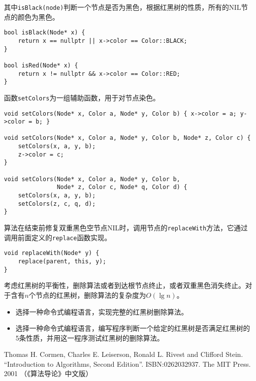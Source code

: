 \documentclass[UTF8]{article}
\begin{document}
其中\texttt{isBlack(node)}判断一个节点是否为黑色，根据红黑树的性质，所有的NIL节点的颜色为黑色。

\begin{lstlisting}
bool isBlack(Node* x) {
    return x == nullptr || x->color == Color::BLACK;
}

bool isRed(Node* x) {
    return x != nullptr && x->color == Color::RED;
}
\end{lstlisting}

函数\texttt{setColors}为一组辅助函数，用于对节点染色。

\begin{lstlisting}
void setColors(Node* x, Color a, Node* y, Color b) { x->color = a; y->color = b; }

void setColors(Node* x, Color a, Node* y, Color b, Node* z, Color c) {
    setColors(x, a, y, b);
    z->color = c;
}

void setColors(Node* x, Color a, Node* y, Color b,
               Node* z, Color c, Node* q, Color d) {
    setColors(x, a, y, b);
    setColors(z, c, q, d);
}
\end{lstlisting}

算法在结束前修复双重黑色空节点NIL时，调用节点的\texttt{replaceWith}方法，它通过调用前面定义的\texttt{replace}函数实现。

\begin{lstlisting}
void replaceWith(Node* y) {
    replace(parent, this, y);
}
\end{lstlisting}

考虑红黑树的平衡性，删除算法或者到达根节点终止，或者双重黑色消失终止。对于含有$n$个节点的红黑树，删除算法的复杂度为$O(\lg n)$。

\begin{Exercise}

\begin{itemize}
\item 选择一种命令式编程语言，实现完整的红黑树删除算法。
\item 选择一种命令式编程语言，编写程序判断一个给定的红黑树是否满足红黑树的5条性质，并用这一程序测试红黑树的删除算法。
\end{itemize}

\end{Exercise}

\ifx\wholebook\relax \else
\begin{thebibliography}{99}

Thomas H. Cormen, Charles E. Leiserson, Ronald L. Rivest and Clifford Stein.
``Introduction to Algorithms, Second Edition''. ISBN:0262032937. The MIT Press. 2001 （《算法导论》中文版）

\end{thebibliography}
\end{document}
